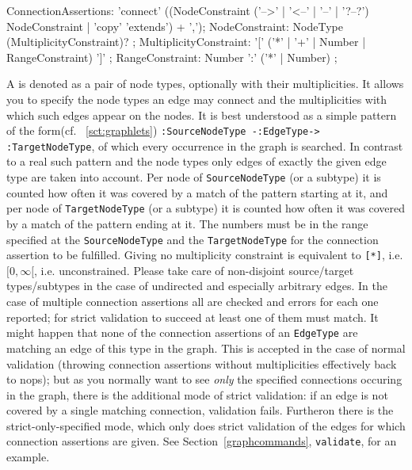 \begin{rail}
  ConnectionAssertions: 'connect' ((NodeConstraint ('-->' | '<--' | '--' | '?--?') NodeConstraint | 'copy' 'extends') + ',');
  NodeConstraint: NodeType (MultiplicityConstraint)? ;
  MultiplicityConstraint: '[' ('*' | '+' | Number | RangeConstraint) ']' ;
  RangeConstraint: Number ':' ('*' | Number) ;
\end{rail}\label{sct:ConnectionAssertions}
A \emph{} is denoted as a pair of node types, optionally with their multiplicities.
It allows you to specify the node types an edge may connect and the multiplicities with which such edges appear on the nodes.
It is best understood as a simple pattern of the form(cf. ~\ref{sct:graphlets}) \texttt{:SourceNodeType -:EdgeType-> :TargetNodeType}, of which every occurrence in the graph is searched.
In contrast to a real such pattern and the node types only edges of exactly the given edge type are taken into account.
Per node of \texttt{SourceNodeType} (or a subtype) it is counted how often it was covered by a match of the pattern starting at it,
and per node of \texttt{TargetNodeType} (or a subtype) it is counted how often it was covered by a match of the pattern ending at it.
The numbers must be in the range specified at the \texttt{SourceNodeType} and the \texttt{TargetNodeType} for the connection assertion to be fulfilled.
Giving no multiplicity constraint is equivalent to \verb#[*]#, i.e. $[0,\infty[$, i.e. unconstrained.
Please take care of non-disjoint source/target types/subtypes in the case of undirected and especially arbitrary edges.
In the case of multiple connection assertions all are checked and errors for each one reported; for strict validation to succeed at least one of them must match.
It might happen that none of the connection assertions of an \texttt{EdgeType} are matching an edge of this type in the graph.
This is accepted in the case of normal validation (throwing connection assertions without multiplicities effectively back to nops);
but as you normally want to see \emph{only} the specified connections occuring in the graph,
there is the additional mode of strict validation: if an edge is not covered by a single matching connection, validation fails.
Furtheron there is the strict-only-specified mode, which only does strict validation of the edges for which connection assertions are given.
See Section~\ref{graphcommands}, \texttt{validate}, for an example.

